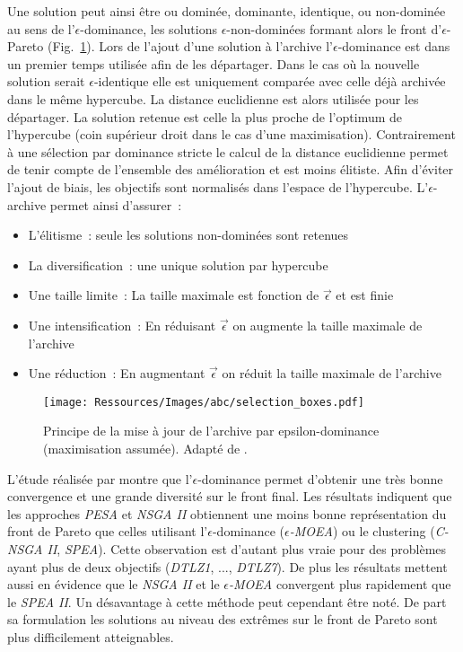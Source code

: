Une solution peut ainsi être ou dominée, dominante, identique, ou non-dominée au sens de
l’$\epsilon$-dominance, les solutions $\epsilon$-non-dominées formant alors le front
d’$\epsilon$-Pareto (Fig.~\ref{fig:epsilon_dominance}). Lors de l’ajout d’une solution à
l’archive l’$\epsilon$-dominance est dans un premier temps utilisée afin de les
départager. Dans le cas où la nouvelle solution serait $\epsilon$-identique elle est
uniquement comparée avec celle déjà archivée dans le même hypercube. La distance
euclidienne est alors utilisée pour les départager. La solution retenue est celle la plus
proche de l’optimum de l’hypercube (coin supérieur droit dans le cas d’une maximisation).
Contrairement à une sélection par dominance stricte le calcul de la distance euclidienne
permet de tenir compte de l’ensemble des amélioration et est moins élitiste. Afin d’éviter
l’ajout de biais, les objectifs sont normalisés dans l’espace de l’hypercube.
L’$\epsilon$-archive permet ainsi d’assurer~:
\begin{itemize}
  \item L’élitisme~: seule les solutions non-dominées sont retenues
  \item La diversification~: une unique solution par hypercube
  \item Une taille limite~: La taille maximale est fonction de $\vec{\epsilon}$ et est finie
  \item Une intensification~: En réduisant $\vec{\epsilon}$ on augmente la taille maximale de l’archive
  \item Une réduction~: En augmentant $\vec{\epsilon}$ on réduit la taille maximale de l’archive
\end{itemize}

\begin{figure}
    \begin{center}
        \texttt{[image: Ressources/Images/abc/selection\_boxes.pdf]}
    \end{center}
    \caption{Principe de la mise à jour de l’archive par epsilon-dominance (maximisation assumée).
             Adapté de \cite{Deb2005501}.
             \label{fig:epsilon_dominance}}
\end{figure}
L’étude réalisée par \textcite{Deb2005501} montre que l’$\epsilon$-dominance permet
d’obtenir une très bonne convergence et une grande diversité sur le front final.
Les résultats indiquent que les approches \textit{PESA} et \textit{NSGA II} obtiennent une moins
bonne représentation du front de Pareto que celles utilisant l’$\epsilon$-dominance
(\textit{$\epsilon$-MOEA}) ou le clustering (\textit{C-NSGA II}, \textit{SPEA}).
Cette observation est d’autant plus vraie pour des problèmes ayant plus de deux
objectifs (\textit{DTLZ1}, ..., \textit{DTLZ7}).
De plus les résultats mettent aussi en évidence que le \textit{NSGA II} et le \textit{$\epsilon$-MOEA}
convergent plus rapidement que le \textit{SPEA II}.
Un désavantage à cette méthode peut cependant être noté. De part sa formulation
les solutions au niveau des extrêmes sur le front de Pareto sont plus difficilement
atteignables.

